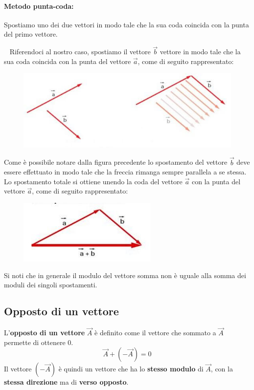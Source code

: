 \documentclass[12pt,oneside]{book}
\begin{document}
\paragraph{Metodo punta-coda:} Spostiamo uno dei due vettori in modo tale che la sua coda coincida con la punta del primo vettore.

~\newline
\noindent Riferendoci al nostro caso, spostiamo il vettore $\vec{b}$ vettore in modo tale che la sua coda coincida con la
punta del vettore $\vec{a}$, come di seguito rappresentato:
\begin{figure}[h]
    \includegraphics[scale=0.5]{punta_coda}
    \centering
\end{figure}

Come è possibile notare dalla figura precedente lo spostamento del vettore $\vec{b}$ deve essere effettuato in modo
tale che la freccia rimanga sempre parallela a se stessa.
Lo spostamento totale si ottiene unendo la coda del vettore $\vec{a}$ con la punta del vettore $\vec{a}$, come di seguito
rappresentato:
\begin{figure}[h]
    \includegraphics[scale=0.5]{vettori_sommati}
    \centering
\end{figure}

Si noti che in generale il modulo del vettore somma non è uguale alla somma dei moduli dei singoli spostamenti.

\subsection{Opposto di un vettore}
L'\textbf{opposto di un vettore} $\vec{A}$ è definito come il vettore che sommato a $\vec{A}$ permette di ottenere 0.
\begin{equation*}
    \vec{A} + (- \vec{A} ) = 0
\end{equation*}
Il vettore $(-\vec{A})$ è quindi un vettore che ha lo \textbf{stesso modulo} di $\vec{A}$, con la \textbf{stessa direzione} ma di \textbf{verso opposto}.
\end{document}

